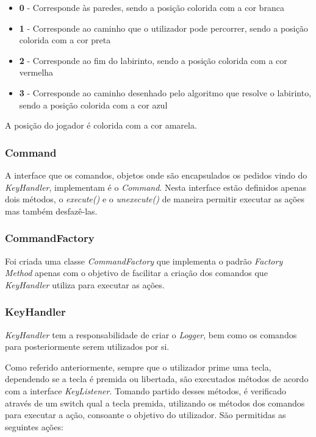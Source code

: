 \documentclass[10pt,portuguese]{article}
\begin{document}
\begin{itemize}
    \item \textbf{0} - Corresponde às paredes, sendo a posição colorida com a cor branca
    \item \textbf{1} - Corresponde ao caminho que o utilizador pode percorrer, sendo a posição colorida com a cor preta
    \item \textbf{2} - Corresponde ao fim do labirinto, sendo a posição colorida com a cor vermelha
    \item \textbf{3} - Corresponde ao caminho desenhado pelo algoritmo que resolve o labirinto, sendo a posição colorida com a cor azul
\end{itemize}

\par A posição do jogador é colorida com a cor amarela.

\subsubsection{Command}

\par A interface que os comandos, objetos onde são encapsulados os pedidos vindo do \textit{KeyHandler}, implementam é o \textit{Command}. Nesta interface estão definidos apenas dois métodos, o \textit{execute()} e o \textit{unexecute()} de maneira permitir executar as ações mas também desfazê-las.

\subsubsection{CommandFactory}

\par Foi criada uma classe \textit{CommandFactory} que implementa o padrão \textit{Factory Method} apenas com o objetivo de facilitar a criação dos comandos que \textit{KeyHandler} utiliza para executar as ações.

\subsubsection{KeyHandler}

\par \textit{KeyHandler} tem a responsabilidade de criar o \textit{Logger}, bem como os comandos para posteriormente serem utilizados por si.

\par Como referido anteriormente, sempre que o utilizador prime uma tecla, dependendo se a tecla é premida ou libertada, são executados métodos de acordo com a interface \textit{KeyListener}. Tomando partido desses métodos, é verificado através de um switch qual a tecla premida, utilizando os métodos dos comandos para executar a ação, consoante o objetivo do utilizador. São permitidas as seguintes ações:
\end{document}
